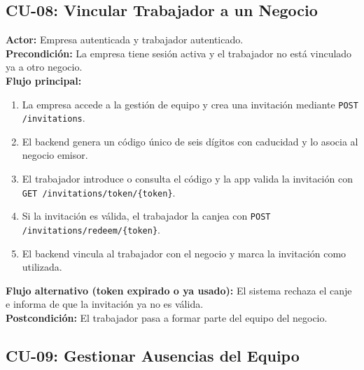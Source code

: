 \documentclass[12pt,a4paper,twoside]{report}
\begin{document}
\subsection{CU-08: Vincular Trabajador a un Negocio}

\begin{tcolorbox}[definicionStyle, title={CU-08 — Invitación y Vinculación de Trabajador}]
\textbf{Actor:} Empresa autenticada y trabajador autenticado. \\
\textbf{Precondición:} La empresa tiene sesión activa y el trabajador no está vinculado ya a otro negocio. \\
\textbf{Flujo principal:}
\begin{enumerate}
  \item La empresa accede a la gestión de equipo y crea una invitación mediante \texttt{POST /invitations}.
  \item El backend genera un código único de seis dígitos con caducidad y lo asocia al negocio emisor.
  \item El trabajador introduce o consulta el código y la app valida la invitación con \texttt{GET /invitations/token/\{token\}}.
  \item Si la invitación es válida, el trabajador la canjea con \texttt{POST /invitations/redeem/\{token\}}.
  \item El backend vincula al trabajador con el negocio y marca la invitación como utilizada.
\end{enumerate}
\textbf{Flujo alternativo (token expirado o ya usado):} El sistema rechaza el canje e informa de que la invitación ya no es válida. \\
\textbf{Postcondición:} El trabajador pasa a formar parte del equipo del negocio.
\end{tcolorbox}

\subsection{CU-09: Gestionar Ausencias del Equipo}
\end{document}
